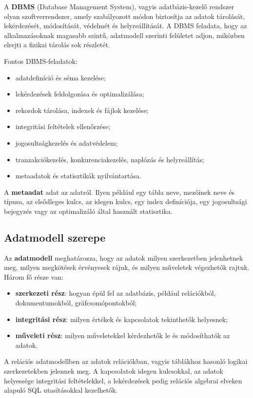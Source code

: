 A \textbf{DBMS} (Database Management System), vagyis adatbázis-kezelő rendszer olyan szoftverrendszer, amely szabályozott módon biztosítja az adatok tárolását, lekérdezését, módosítását, védelmét és helyreállítását. A DBMS feladata, hogy az alkalmazásoknak magasabb szintű, adatmodell szerinti felületet adjon, miközben elrejti a fizikai tárolás sok részletét.

Fontos DBMS-feladatok:

\begin{itemize}
  \item adatdefiníció és séma kezelése;
  \item lekérdezések feldolgozása és optimalizálása;
  \item rekordok tárolása, indexek és fájlok kezelése;
  \item integritási feltételek ellenőrzése;
  \item jogosultságkezelés és adatvédelem;
  \item tranzakciókezelés, konkurenciakezelés, naplózás és helyreállítás;
  \item metaadatok és statisztikák nyilvántartása.
\end{itemize}

A \textbf{metaadat} adat az adatról. Ilyen például egy tábla neve, mezőinek neve és típusa, az elsődleges kulcs, az idegen kulcs, egy index definíciója, egy jogosultsági bejegyzés vagy az optimalizáló által használt statisztika.

\subsection{Adatmodell szerepe}

Az \textbf{adatmodell} meghatározza, hogy az adatok milyen szerkezetben jelenhetnek meg, milyen megkötések érvényesek rájuk, és milyen műveletek végezhetők rajtuk. Három fő része van:

\begin{itemize}
  \item \textbf{szerkezeti rész}: hogyan épül fel az adatbázis, például relációkból, dokumentumokból, gráfcsomópontokból;
  \item \textbf{integritási rész}: milyen értékek és kapcsolatok tekinthetők helyesnek;
  \item \textbf{műveleti rész}: milyen műveletekkel kérdezhetők le és módosíthatók az adatok.
\end{itemize}

A relációs adatmodellben az adatok relációkban, vagyis táblákhoz hasonló logikai szerkezetekben jelennek meg. A kapcsolatok idegen kulcsokkal, az adatok helyessége integritási feltételekkel, a lekérdezések pedig relációs algebrai elveken alapuló SQL utasításokkal kezelhetők.


